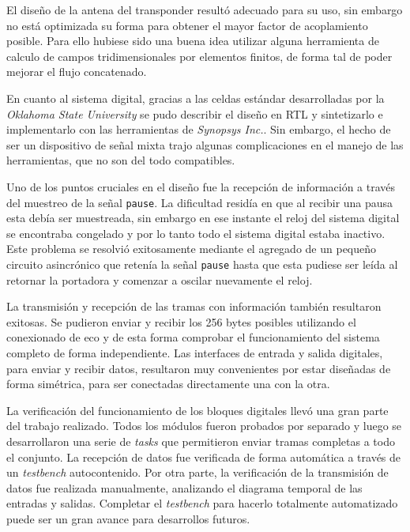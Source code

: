 El diseño de la antena del transponder resultó adecuado para su uso, 
sin embargo no está optimizada su forma para obtener el mayor factor 
de acoplamiento posible. Para ello hubiese sido una buena idea 
utilizar alguna herramienta de calculo de campos tridimensionales por 
elementos finitos, de forma tal de poder mejorar el flujo concatenado.

En cuanto al sistema digital, gracias a las celdas estándar 
desarrolladas por la \emph{Oklahoma State University} se pudo 
describir el diseño en RTL y sintetizarlo e implementarlo con las 
herramientas de \emph{Synopsys Inc.}. Sin embargo, el hecho de ser un 
dispositivo de señal mixta trajo algunas complicaciones en el manejo 
de las herramientas, que no son del todo compatibles.

Uno de los puntos cruciales en el diseño fue la recepción de 
información a través del muestreo de la señal \lstinline{pause}. La 
dificultad residía en que al recibir una pausa esta debía ser 
muestreada, sin embargo en ese instante el reloj del sistema digital 
se encontraba congelado y por lo tanto todo el sistema digital estaba 
inactivo. Este problema se resolvió exitosamente mediante el agregado 
de un pequeño circuito asincrónico que retenía la señal 
\lstinline{pause} hasta que esta pudiese ser leída al retornar la 
portadora y comenzar a oscilar nuevamente el reloj.

La transmisión y recepción de las tramas con información también 
resultaron exitosas. Se pudieron enviar y recibir los 256 bytes 
posibles utilizando el conexionado de eco y de esta forma comprobar 
el funcionamiento del sistema completo de forma independiente. Las 
interfaces de entrada y salida digitales, para enviar y recibir datos, 
resultaron muy convenientes por estar diseñadas de forma simétrica, 
para ser conectadas directamente una con la otra.

La verificación del funcionamiento de los bloques digitales llevó una 
gran parte del trabajo realizado. Todos los módulos fueron probados 
por separado y luego se desarrollaron una serie de \emph{tasks} que 
permitieron enviar tramas completas a todo el conjunto. La recepción 
de datos fue verificada de forma automática a través de un 
\emph{testbench} autocontenido. Por otra parte, la verificación de la 
transmisión de datos fue realizada manualmente, analizando el diagrama 
temporal de las entradas y salidas. Completar el \emph{testbench} para 
hacerlo totalmente automatizado puede ser un gran avance para 
desarrollos futuros.

